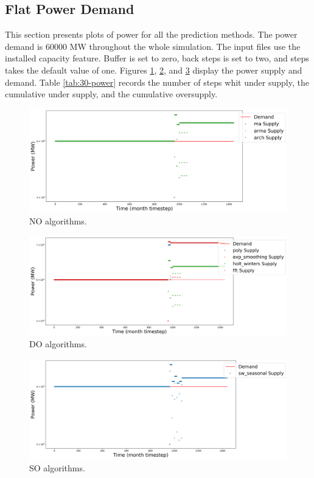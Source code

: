 \documentclass[11pt]{article}
\begin{document}
\subsection{Flat Power Demand}

This section presents plots of power for all the prediction methods. The power demand is 60000 MW throughout the whole simulation. The input files use the installed capacity feature. Buffer is set to zero, back steps is set to two, and steps takes the default value of one.
Figures \ref{fig:30-NO}, \ref{fig:30-DO}, and \ref{fig:30-SO} display the power supply and demand.
Table \ref{tab:30-power} records the number of steps whit under supply, the cumulative under supply, and the cumulative oversupply.

\begin{figure}[H]
	\centering
	\includegraphics[width=\textwidth]{30-figures/30-power-buffer01.png} 
	\hfill
	\caption{NO algorithms.}
	\label{fig:30-NO}
\end{figure}

\begin{figure}[H]
	\centering
	\includegraphics[width=\textwidth]{30-figures/30-power-buffer02.png} 
	\hfill
	\caption{DO algorithms.}
	\label{fig:30-DO}
\end{figure}

\begin{figure}[H]
	\centering
	\includegraphics[width=\textwidth]{30-figures/30-power-buffer03.png} 
	\hfill
	\caption{SO algorithms.}
	\label{fig:30-SO}
\end{figure}
\end{document}
